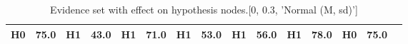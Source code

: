 \begin{table}
\begin{tabular}{c|cc|cc|cc|cc|cc|cc|cc}
\cellcolor{Bittersweet}H0&\cellcolor{Bittersweet}75.0&\cellcolor{Bittersweet}H1&\cellcolor{Bittersweet}43.0&\cellcolor{Bittersweet}H1&\cellcolor{Bittersweet}71.0&\cellcolor{Bittersweet}H1&\cellcolor{Bittersweet}53.0&\cellcolor{Bittersweet}H1&\cellcolor{Bittersweet}56.0&\cellcolor{Bittersweet}H1&\cellcolor{Bittersweet}78.0&\cellcolor{Bittersweet}H0&\cellcolor{Bittersweet}75.0\\\bottomrule\end{tabular}\caption{Evidence set with effect on hypothesis nodes.[0, 0.3, 'Normal (M, sd)']}\end{table}